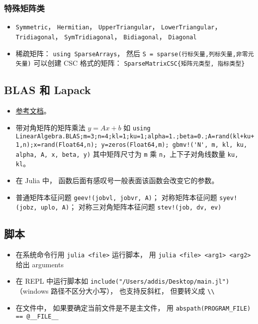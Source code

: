 \subsubsection{特殊矩阵类}
\begin{itemize}
\item \verb|Symmetric|， \verb|Hermitian|， \verb|UpperTriangular|， \verb|LowerTriangular|， \verb|Tridiagonal|， \verb|SymTridiagonal|， \verb|Bidiagonal|， \verb|Diagonal|
\item 稀疏矩阵： \verb|using SparseArrays|， 然后 \verb|S = sparse(行标矢量,列标矢量,非零元矢量)| 可以创建 CSC 格式的矩阵： \verb|SparseMatrixCSC{矩阵元类型, 指标类型}|
\end{itemize}

\subsection{BLAS 和 Lapack}
\begin{itemize}
\item \href{https://docs.julialang.org/en/v1/stdlib/LinearAlgebra/}{参考文档}。
\item 带对角矩阵的矩阵乘法 $y = Ax+b$ 如 \verb|using LinearAlgebra.BLAS;m=3;n=4;kl=1;ku=1;alpha=1.;beta=0.;A=rand(kl+ku+1,n);x=rand(Float64,n); y=zeros(Float64,m); gbmv!('N', m, kl, ku, alpha, A, x, beta, y)| 其中矩阵尺寸为 \verb|m| 乘 \verb|n|，上下子对角线数量 \verb|ku, kl|。
\item 在 Julia 中， 函数后面有感叹号一般表面该函数会改变它的参数。
\item 普通矩阵本征问题 \verb|geev!(jobvl, jobvr, A)|； 对称矩阵本征问题 \verb|syev!(jobz, uplo, A)|； 对称三对角矩阵本征问题 \verb|stev!(job, dv, ev)|
\end{itemize}

\subsection{脚本}
\begin{itemize}
\item 在系统命令行用 \verb|julia <file>| 运行脚本， 用 \verb|julia <file> <arg1> <arg2>| 给出 arguments
\item 在 REPL 中运行脚本如 \verb|include("/Users/addis/Desktop/main.jl")|（windows 路径不区分大小写）， 也支持反斜杠， 但要转义成 \verb|\\|
\item 在文件中， 如果要确定当前文件是不是主文件， 用 \verb|abspath(PROGRAM_FILE) == @__FILE__|
\end{itemize}

